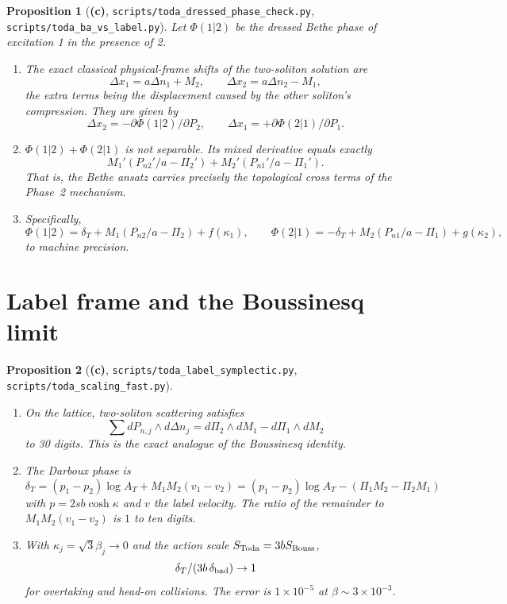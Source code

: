 \documentclass[11pt,a4paper]{article}
\newcommand{\Lc}{\textsf{\textbf{(c)}}}\newcommand{\Ld}{\textsf{\textbf{(d)}}}
\newcommand{\script}[1]{\texttt{scripts/#1}}
\newtheorem{proposition}{Proposition}\theoremstyle{remark}\newtheorem{remark}{Remark}
\begin{document}
\begin{proposition}[\Lc, \script{toda\_dressed\_phase\_check.py}, \script{toda\_ba\_vs\_label.py}]
Let $\Phi(1|2)$ be the dressed Bethe phase of excitation 1 in the presence of 2.
\begin{enumerate}
\item The exact classical physical-frame shifts of the two-soliton solution are
\[
\Delta x_1=a\Delta n_1+M_2,\qquad \Delta x_2=a\Delta n_2-M_1 ,
\]
the extra terms being the displacement caused by the other soliton's compression. They are given by
\[
\Delta x_2=-\partial\Phi(1|2)/\partial P_2,\qquad \Delta x_1=+\partial\Phi(2|1)/\partial P_1 .
\]
\item $\Phi(1|2)+\Phi(2|1)$ is \emph{not} separable. Its mixed derivative equals exactly
\[
M_1'(P_{n2}'/a-\Pi_2')+M_2'(P_{n1}'/a-\Pi_1').
\]
That is, the Bethe ansatz carries precisely the topological cross terms of the Phase~2 mechanism.
\item Specifically,
\[
\Phi(1|2)=\delta_T+M_1(P_{n2}/a-\Pi_2)+f(\kappa_1),\qquad \Phi(2|1)=-\delta_T+M_2(P_{n1}/a-\Pi_1)+g(\kappa_2),
\]
to machine precision.
\end{enumerate}
\end{proposition}

\section{Label frame and the Boussinesq limit}

\begin{proposition}[\Lc, \script{toda\_label\_symplectic.py}, \script{toda\_scaling\_fast.py}]
\begin{enumerate}
\item On the lattice, two-soliton scattering satisfies
\[
\sum dP_{n,j}\wedge d\Delta n_j=d\Pi_2\wedge dM_1-d\Pi_1\wedge dM_2
\]
to 30 digits. This is the exact analogue of the Boussinesq identity.
\item The Darboux phase is
\[
\boxed{\delta_T=(p_1-p_2)\log A_T+M_1M_2(v_1-v_2)=(p_1-p_2)\log A_T-(\Pi_1M_2-\Pi_2M_1)}
\]
with $p=2sb\cosh\kappa$ and $v$ the label velocity. The ratio of the remainder to $M_1M_2(v_1-v_2)$ is $1$ to ten digits.
\item With $\kappa_j=\sqrt3\beta_j\to0$ and the action scale $S_{\rm Toda}=3bS_{\rm Bouss}$,
\[
\delta_T/(3b\,\delta_{\rm bad})\to1
\]
for overtaking \emph{and} head-on collisions. The error is $1\times10^{-5}$ at $\beta\sim3\times10^{-3}$.
\end{enumerate}
\end{proposition}
\end{document}
